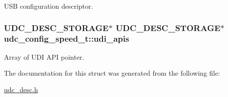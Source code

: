 \-U\-S\-B configuration descriptor. 

\hypertarget{structudc__config__speed__t_a2e343b988012ad9192a133d50eeab703}{
\subsubsection[{udi\-\_\-apis}]{ \-U\-D\-C\-\_\-\-D\-E\-S\-C\-\_\-\-S\-T\-O\-R\-A\-G\-E$\ast$ \-U\-D\-C\-\_\-\-D\-E\-S\-C\-\_\-\-S\-T\-O\-R\-A\-G\-E$\ast$ {\bf udc\-\_\-config\-\_\-speed\-\_\-t\-::udi\-\_\-apis}}}
\label{structudc__config__speed__t_a2e343b988012ad9192a133d50eeab703}


\-Array of \-U\-D\-I \-A\-P\-I pointer. 



\-The documentation for this struct was generated from the following file\-:\begin{DoxyCompactItemize}
\item 
\hyperlink{udc__desc_8h}{udc\-\_\-desc.\-h}\end{DoxyCompactItemize}
